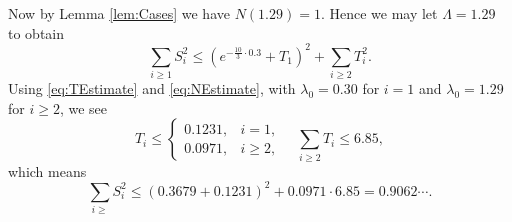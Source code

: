 \documentclass[10pt, reqno]{amsart}
\numberwithin{equation}{section}
\begin{document}
Now by Lemma \ref{lem:Cases} we have $N(1.29)=1$. Hence we may let $\Lambda=1.29$ to obtain
\begin{equation}\label{eq:SumSquaresCase2}
\sum_{i\geq 1}S_i^2\leq (e^{-\frac{10}{3}\cdot 0.3}+T_1)^2+\sum_{i\geq 2} T_i^2.
\end{equation}
Using \eqref{eq:TEstimate} and \eqref{eq:NEstimate}, with $\lambda_0=0.30$ for $i=1$ and $\lambda_0=1.29$ for $i\geq 2$, we see
\begin{equation}\label{eq:TiValues}
T_i\leq \begin{cases}
0.1231,& i=1, \\
0.0971,& i\geq 2,
\end{cases}
\quad \sum_{i\geq 2}T_i\leq 6.85,
\end{equation}
which means
\begin{equation}\label{eq:FinalBoundCase2}
\sum_{i\geq }S_i^2\leq (0.3679+0.1231)^2+0.0971\cdot 6.85=0.9062\cdots.
\end{equation}
\end{document}
